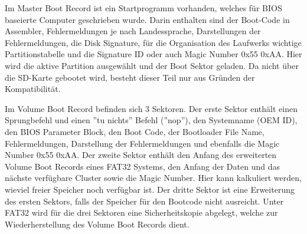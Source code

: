 
Im Master Boot Record ist ein Startprogramm vorhanden, welches für BIOS baseierte Computer geschrieben wurde.
Darin enthalten sind der Boot-Code in Assembler, Fehlermeldungen je nach Landessprache, Darstellungen der Fehlermeldungen, die Disk Signature, für die Organisation des Laufwerks wichtige Partitionstabelle und die Signature ID oder auch Magic Number 0x55 0xAA. Hier wird die aktive Partition ausgewählt und der Boot Sektor geladen. Da nicht über die SD-Karte gebootet wird, besteht dieser Teil nur aus Gründen der Kompatibilität.



Im Volume Boot Record befinden sich 3 Sektoren. Der erste Sektor enthält einen Sprungbefehl und einen ''tu nichts'' Befehl (''nop''), den Systemname (OEM ID), den BIOS Parameter Block, den Boot Code, der Bootloader File Name, Fehlermeldungen, Darstellung der Fehlermeldungen und ebenfalls die Magic Number 0x55 0xAA. Der zweite Sektor enthält den Anfang des erweiterten Volume Boot Records eines FAT32 Systems, den Anfang der Daten und das nächste verfügbare Cluster sowie die Magic Number. Hier kann kalkuliert werden, wieviel freier Speicher noch verfügbar ist. Der dritte Sektor ist eine Erweiterung des ersten Sektors, falls der Speicher für den Bootcode nicht ausreicht. Unter FAT32 wird für die drei Sektoren eine Sicherheitskopie abgelegt, welche zur Wiederherstellung des Volume Boot Records dient.

